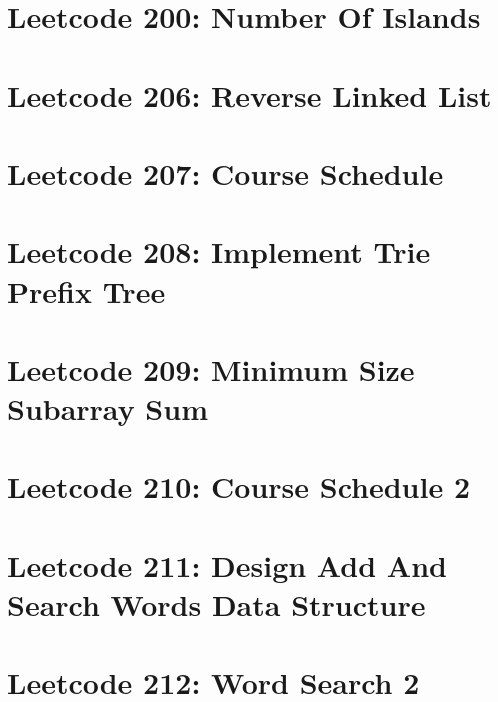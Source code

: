 \documentclass{article}
\begin{document}
\section*{Leetcode 200: Number Of Islands}

\pagebreak 

\section*{Leetcode 206: Reverse Linked List}

\pagebreak 

\section*{Leetcode 207: Course Schedule}

\pagebreak 

\section*{Leetcode 208: Implement Trie Prefix Tree}

\pagebreak 

\section*{Leetcode 209: Minimum Size Subarray Sum}

\pagebreak 

\section*{Leetcode 210: Course Schedule 2}

\pagebreak 

\section*{Leetcode 211: Design Add And Search Words Data Structure}

\pagebreak 

\section*{Leetcode 212: Word Search 2}

\pagebreak 
\end{document}
